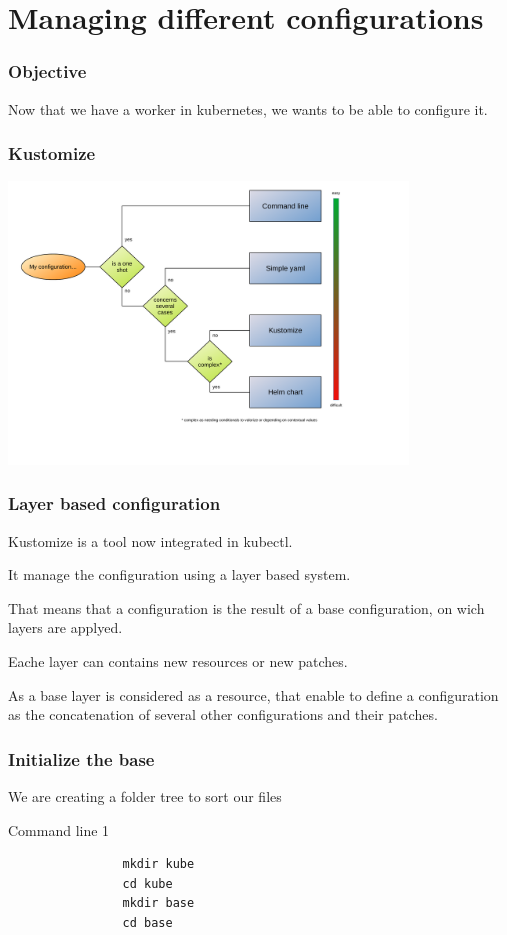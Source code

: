\section{Managing different configurations}

	\begin{frame}
		\frametitle{Objective}
		
		Now that we have a worker in kubernetes, we wants to be able to configure it.
		
	\end{frame}
	
	\begin{frame}
		\frametitle{Kustomize}
		
		\begin{center}
		\includegraphics[height=7.5cm]{../../../resources/color/choiceConfigKind.pdf}
		\end{center}
	\end{frame}
	
	\begin{frame}
		\frametitle{Layer based configuration}
		
		Kustomize is a tool now integrated in kubectl.
		
		\bigskip
		It manage the configuration using a layer based system.
		
		That means that a configuration is the result of a base configuration, on wich layers are applyed.
		
		Eache layer can contains new resources or new patches.
		
		\bigskip
		As a base layer is considered as a resource, that enable to define a configuration as the concatenation of several other configurations and their patches.
	\end{frame}
	
	\begin{frame}[fragile]
		\frametitle{Initialize the base}
		
		We are creating a folder tree to sort our files
		\begin{block}{Command line 1}
			\begin{verbatim}
				mkdir kube
				cd kube
				mkdir base
				cd base
			\end{verbatim}
		\end{block}
	\end{frame}
	
